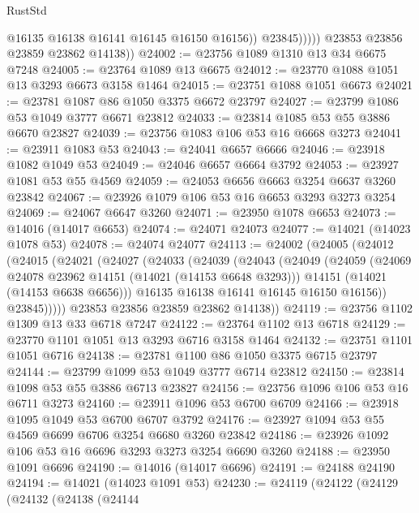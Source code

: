 \begin{lexlean}{RustStd}
\begin{coremodule}
                      @16135
                      @16138
                      @16141
                      @16145
                      @16150
                      @16156))
                  @23845)))))
        @23853
        @23856
        @23859
        @23862
        @14138))
@24002 := @23756 @1089 @1310 @13 @34 @6675 @7248
@24005 := @23764 @1089 @13 @6675
@24012 := @23770 @1088 @1051 @13 @3293 @6673 @3158 @1464
@24015 := @23751 @1088 @1051 @6673
@24021 := @23781 @1087 @86 @1050 @3375 @6672 @23797
@24027 := @23799 @1086 @53 @1049 @3777 @6671 @23812
@24033 := @23814 @1085 @53 @55 @3886 @6670 @23827
@24039 := @23756 @1083 @106 @53 @16 @6668 @3273
@24041 := @23911 @1083 @53
@24043 := @24041 @6657 @6666
@24046 := @23918 @1082 @1049 @53
@24049 := @24046 @6657 @6664 @3792
@24053 := @23927 @1081 @53 @55 @4569
@24059 := @24053 @6656 @6663 @3254 @6637 @3260 @23842
@24067 := @23926 @1079 @106 @53 @16 @6653 @3293 @3273 @3254
@24069 := @24067 @6647 @3260
@24071 := @23950 @1078 @6653
@24073 := @14016 (@14017 @6653)
@24074 := @24071 @24073
@24077 := @14021 (@14023 @1078 @53)
@24078 := @24074 @24077
@24113 := @24002
    (@24005
      (@24012
        (@24015
          (@24021
            (@24027
              (@24033
                (@24039
                  (@24043
                    (@24049
                      (@24059
                        (@24069 @24078 @23962 @14151 (@14021 (@14153 @6648 @3293)))
                        @14151
                        (@14021 (@14153 @6638 @6656)))
                      @16135
                      @16138
                      @16141
                      @16145
                      @16150
                      @16156))
                  @23845)))))
        @23853
        @23856
        @23859
        @23862
        @14138))
@24119 := @23756 @1102 @1309 @13 @33 @6718 @7247
@24122 := @23764 @1102 @13 @6718
@24129 := @23770 @1101 @1051 @13 @3293 @6716 @3158 @1464
@24132 := @23751 @1101 @1051 @6716
@24138 := @23781 @1100 @86 @1050 @3375 @6715 @23797
@24144 := @23799 @1099 @53 @1049 @3777 @6714 @23812
@24150 := @23814 @1098 @53 @55 @3886 @6713 @23827
@24156 := @23756 @1096 @106 @53 @16 @6711 @3273
@24160 := @23911 @1096 @53 @6700 @6709
@24166 := @23918 @1095 @1049 @53 @6700 @6707 @3792
@24176 := @23927 @1094 @53 @55 @4569 @6699 @6706 @3254 @6680 @3260 @23842
@24186 := @23926 @1092 @106 @53 @16 @6696 @3293 @3273 @3254 @6690 @3260
@24188 := @23950 @1091 @6696
@24190 := @14016 (@14017 @6696)
@24191 := @24188 @24190
@24194 := @14021 (@14023 @1091 @53)
@24230 := @24119
    (@24122
      (@24129
        (@24132
          (@24138
            (@24144

\end{coremodule}
\end{lexlean}
